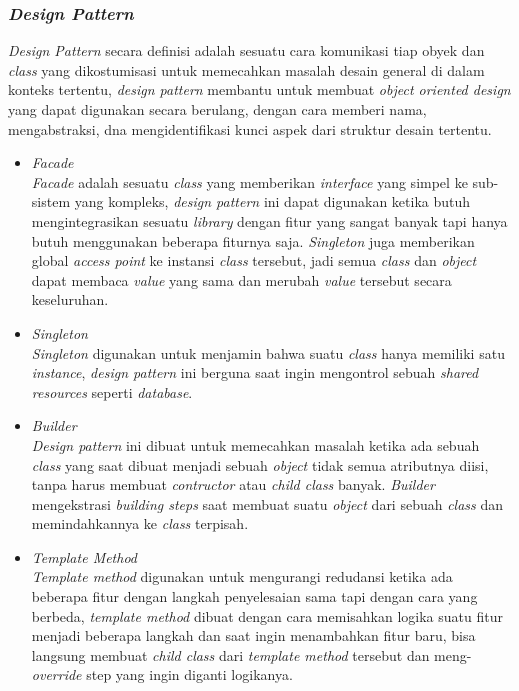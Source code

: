 \documentclass[a4paper]{article}
\newcommand{\subsubbab}[1]{%
    \subsubsection{#1}%
}
\begin{document}
\subsubbab{\textit{Design Pattern}}
\textit{Design Pattern} secara definisi adalah sesuatu cara komunikasi tiap obyek dan \textit{class} yang dikostumisasi untuk memecahkan masalah desain general di dalam konteks tertentu, \textit{design pattern} membantu untuk membuat \textit{object oriented design} yang dapat digunakan secara berulang, dengan cara memberi nama, mengabstraksi, dna mengidentifikasi kunci aspek dari struktur desain tertentu\autocite[13]{design-pattern-2588942}.
\begin{itemize}
    \item \textit{Facade}\\
          \textit{Facade} adalah sesuatu \textit{class} yang memberikan \textit{interface} yang simpel ke sub-sistem yang kompleks, \textit{design pattern} ini dapat digunakan ketika butuh mengintegrasikan sesuatu \textit{library} dengan fitur yang sangat banyak tapi hanya butuh menggunakan beberapa fiturnya saja\autocite[210]{refactoring-guru}. \textit{Singleton} juga memberikan global \textit{access point} ke instansi \textit{class} tersebut, jadi semua \textit{class} dan \textit{object} dapat membaca \textit{value} yang sama dan merubah \textit{value} tersebut secara keseluruhan\autocite[210]{refactoring-guru}.
    \item \textit{Singleton}\\
          \textit{Singleton} digunakan untuk menjamin bahwa suatu \textit{class} hanya memiliki satu \textit{instance}, \textit{design pattern} ini berguna saat ingin mengontrol sebuah \textit{shared resources} seperti \textit{database}\autocite[137-138]{refactoring-guru}.
    \item \textit{Builder}\\
          \textit{Design pattern} ini dibuat untuk memecahkan masalah ketika ada sebuah \textit{class} yang saat dibuat menjadi sebuah \textit{object} tidak semua atributnya diisi, tanpa harus membuat \textit{contructor} atau \textit{child class} banyak. \textit{Builder} mengekstrasi \textit{building steps} saat membuat suatu \textit{object} dari sebuah \textit{class} dan memindahkannya ke \textit{class} terpisah\autocite[103-105]{refactoring-guru}.
    \item \textit{Template Method}\\
          \textit{Template method} digunakan untuk mengurangi redudansi ketika ada beberapa fitur dengan langkah penyelesaian sama tapi dengan cara yang berbeda, \textit{template method} dibuat dengan cara memisahkan logika suatu fitur menjadi beberapa langkah dan saat ingin menambahkan fitur baru, bisa langsung membuat \textit{child class} dari \textit{template method} tersebut dan meng-\textit{override} step yang ingin diganti logikanya\autocite[382-384]{refactoring-guru}.
\end{itemize}
\end{document}
